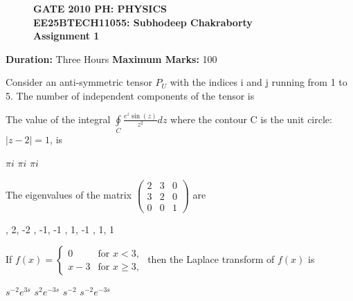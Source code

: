 \documentclass{exam}
\begin{document}
\begin{figure}[H] \centering
	\textbf{GATE 2010 PH: PHYSICS} \\
	\textbf{EE25BTECH11055: Subhodeep Chakraborty} \\
	\textbf{Assignment 1}
\end{figure}

\noindent\textbf{Duration:} Three Hours \hfill \textbf{Maximum Marks:} 100

\hrulefill

\begin{questions}
\question Consider an anti-symmetric tensor $P_{U}$ with the indices i and j running from 1 to 5. The number of independent components of the tensor is \hfill{}


\begin{oneparchoices}
	   
\end{oneparchoices}

\question The value of the integral $\oint\limits_{C}\frac{e^{z}\sin(z)}{z^{2}}dz$ where the contour C is the unit circle: $|z-2|=1$, is\hfill{}


\begin{oneparchoices}
	$\pi i$ $\pi i$ \choice $\pi i$ 
\end{oneparchoices}

\question The eigenvalues of the matrix $\begin{pmatrix} 2 & 3 & 0 \\ 3 & 2 & 0 \\ 0 & 0 & 1 \end{pmatrix}$ are\hfill{}


\begin{oneparchoices}
	, 2, -2 , -1, -1 , 1, -1 , 1, 1
\end{oneparchoices}

\question If $f(x)=\begin{cases}0& \text{for } x<3, \\ x-3& \text{for } x\ge3, \end{cases}$ then the Laplace transform of $f(x)$ is\hfill{}

\begin{oneparchoices}
	\choice $s^{-2}e^{3s}$ \choice $s^{2}e^{-3s}$ \choice $s^{-2}$ \choice $s^{-2}e^{-3s}$
\end{oneparchoices}


\end{questions}
\end{document}
